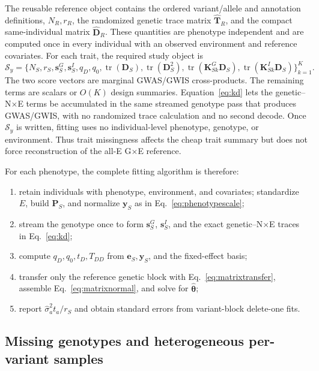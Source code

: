 \documentclass[11pt]{article}
\newcommand{\tr}{\operatorname{tr}}
\newcommand{\bP}{\bm P}
\newcommand{\bK}{\bm K}
\newcommand{\by}{\bm y}
\newcommand{\be}{\bm e}
\newcommand{\bD}{\bm D}
\begin{document}
The reusable reference object contains the ordered variant/allele and
annotation definitions, $N_R,r_R$, the randomized genetic trace matrix
$\widehat{\bm T}_R$, and the compact same-individual matrix
$\widehat{\bm D}_R$.  These quantities are phenotype independent and are
computed once in every individual with an observed environment and reference
covariates.  For each trait, the required study object is
\begin{equation}
 \mathcal S_y=\{N_S,r_S,\bm s^G_S,\bm s^I_S,
 q_D,q_0,\tr(\bD_S),\tr(\bD_S^2),
 \tr(\bK^G_{Sk}\bD_S),\tr(\bK^I_{Sk}\bD_S)\}_{k=1}^K.
 \label{eq:summaryinterface}
\end{equation}
The two score vectors are marginal GWAS/GWIS cross-products.  The remaining
terms are scalars or $O(K)$ design summaries.  Equation~\eqref{eq:kd} lets the
genetic--N$\times$E terms be accumulated in the same streamed genotype pass
that produces GWAS/GWIS, with no randomized trace calculation and no second
decode.  Once $\mathcal S_y$ is written, fitting uses no individual-level
phenotype, genotype, or environment.  Thus trait missingness affects the cheap
trait summary but does not force reconstruction of the all-E G$\times$E
reference.

For each phenotype, the complete fitting algorithm is therefore:
\begin{enumerate}
 \item retain individuals with phenotype, environment, and covariates;
 standardize $E$, build $\bP_S$, and normalize $\by_S$ as in
 Eq.~\eqref{eq:phenotypescale};
 \item stream the genotype once to form $\bm s^G_S$, $\bm s^I_S$, and the
 exact genetic--N$\times$E traces in Eq.~\eqref{eq:kd};
 \item compute $q_D,q_0,t_D,T_{DD}$ from $\be_S,\by_S$, and the fixed-effect
 basis;
 \item transfer only the reference genetic block with
 Eq.~\eqref{eq:matrixtransfer}, assemble Eq.~\eqref{eq:matrixnormal}, and
 solve for $\widehat{\bm\theta}$;
 \item report $\widehat\sigma_a^2t_a/r_S$ and obtain standard errors from
 variant-block delete-one fits.
\end{enumerate}

\subsection{Missing genotypes and heterogeneous per-variant samples}
\end{document}
